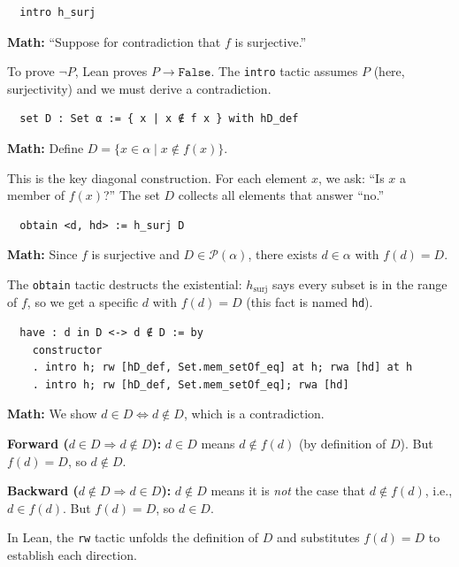 \documentclass[11pt]{article}
\theoremstyle{plain}
\theoremstyle{definition}
\begin{document}
\begin{tcolorbox}[title=Line 3: Assume surjectivity]
\begin{lstlisting}
  intro h_surj
\end{lstlisting}
\textbf{Math:} ``Suppose for contradiction that $f$ is surjective.''

To prove $\neg P$, Lean proves $P \to \texttt{False}$. The \texttt{intro}
tactic assumes $P$ (here, surjectivity) and we must derive a contradiction.
\end{tcolorbox}

\begin{tcolorbox}[title=Line 4: Construct the diagonal set]
\begin{lstlisting}
  set D : Set α := { x | x ∉ f x } with hD_def
\end{lstlisting}
\textbf{Math:} Define $D = \{x \in \alpha \mid x \notin f(x)\}$.

This is the key diagonal construction. For each element $x$, we ask: ``Is $x$
a member of $f(x)$?'' The set $D$ collects all elements that answer ``no.''
\end{tcolorbox}

\begin{tcolorbox}[title=Line 5: Apply surjectivity]
\begin{lstlisting}
  obtain <d, hd> := h_surj D
\end{lstlisting}
\textbf{Math:} Since $f$ is surjective and $D \in \mathcal{P}(\alpha)$, there
exists $d \in \alpha$ with $f(d) = D$.

The \texttt{obtain} tactic destructs the existential: $h_{\text{surj}}$ says
every subset is in the range of $f$, so we get a specific $d$ with
$f(d) = D$ (this fact is named \texttt{hd}).
\end{tcolorbox}

\begin{tcolorbox}[title=Lines 6--9: The paradox --- $d \in D \iff d \notin D$]
\begin{lstlisting}
  have : d in D <-> d ∉ D := by
    constructor
    . intro h; rw [hD_def, Set.mem_setOf_eq] at h; rwa [hd] at h
    . intro h; rw [hD_def, Set.mem_setOf_eq]; rwa [hd]
\end{lstlisting}
\textbf{Math:} We show $d \in D \iff d \notin D$, which is a contradiction.

\textbf{Forward ($d \in D \Rightarrow d \notin D$):}
$d \in D$ means $d \notin f(d)$ (by definition of $D$). But $f(d) = D$,
so $d \notin D$.

\textbf{Backward ($d \notin D \Rightarrow d \in D$):}
$d \notin D$ means it is \emph{not} the case that $d \notin f(d)$, i.e., $d \in f(d)$.
But $f(d) = D$, so $d \in D$.

In Lean, the \texttt{rw} tactic unfolds the definition of $D$ and substitutes
$f(d) = D$ to establish each direction.
\end{tcolorbox}
\end{document}
